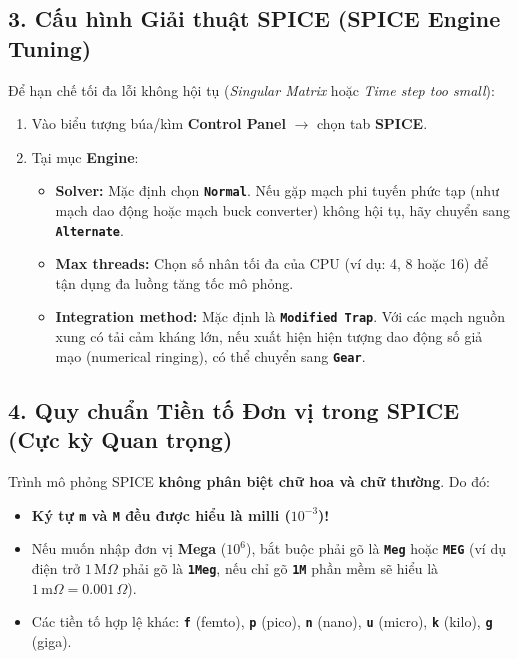 \documentclass[11pt,a4paper]{article}
\newcommand{\code}[1]{\texttt{\color{navy}\textbf{#1}}}
\begin{document}
\subsection{3. Cấu hình Giải thuật SPICE (SPICE Engine Tuning)}
Để hạn chế tối đa lỗi không hội tụ (\textit{Singular Matrix} hoặc \textit{Time step too small}):
\begin{enumerate}[itemsep=2pt]
  \item Vào biểu tượng búa/kìm \textbf{Control Panel} $\rightarrow$ chọn tab \textbf{SPICE}.
  \item Tại mục \textbf{Engine}:
  \begin{itemize}[itemsep=1pt]
    \item \textbf{Solver:} Mặc định chọn \code{Normal}. Nếu gặp mạch phi tuyến phức tạp (như mạch dao động hoặc mạch buck converter) không hội tụ, hãy chuyển sang \code{Alternate}.
    \item \textbf{Max threads:} Chọn số nhân tối đa của CPU (ví dụ: 4, 8 hoặc 16) để tận dụng đa luồng tăng tốc mô phỏng.
    \item \textbf{Integration method:} Mặc định là \code{Modified Trap}. Với các mạch nguồn xung có tải cảm kháng lớn, nếu xuất hiện hiện tượng dao động số giả mạo (numerical ringing), có thể chuyển sang \code{Gear}.
  \end{itemize}
\end{enumerate}

\subsection{4. Quy chuẩn Tiền tố Đơn vị trong SPICE (Cực kỳ Quan trọng)}
\begin{warnbox}
Trình mô phỏng SPICE \textbf{không phân biệt chữ hoa và chữ thường}. Do đó:
\begin{itemize}[itemsep=1pt]
  \item \textbf{Ký tự \code{m} và \code{M} đều được hiểu là milli ($10^{-3}$)!}
  \item Nếu muốn nhập đơn vị \textbf{Mega} ($10^{6}$), bắt buộc phải gõ là \code{Meg} hoặc \code{MEG} (ví dụ điện trở $1\,\text{M}\Omega$ phải gõ là \code{1Meg}, nếu chỉ gõ \code{1M} phần mềm sẽ hiểu là $1\,\text{m}\Omega = 0.001\,\Omega$).
  \item Các tiền tố hợp lệ khác: \code{f} (femto), \code{p} (pico), \code{n} (nano), \code{u} (micro), \code{k} (kilo), \code{g} (giga).
\end{itemize}
\end{warnbox}
\end{document}
